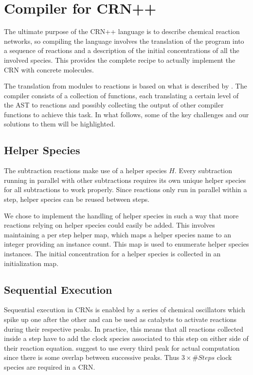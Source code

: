 \section{Compiler for CRN++} %

The ultimate purpose of the CRN++ language is to describe chemical reaction networks, so compiling the language involves the translation of the program into a sequence of reactions and a description of the initial concentrations of all the involved species. This provides the complete recipe to actually implement the CRN with concrete molecules. 

The translation from modules to reactions is based on what is described by \citeauthor{soloveichik2018a} \cite{soloveichik2018a}. The compiler consists of a collection of functions, each translating a certain level of the AST to reactions and possibly collecting the output of other compiler functions to achieve this task. In what follows, some of the key challenges and our solutions to them will be highlighted.

\subsection{Helper Species}
The subtraction reactions make use of a helper species $H$. Every subtraction running in parallel with other subtractions requires its own unique helper species for all subtractions to work properly. Since reactions only run in parallel within a step, helper species can be reused between steps. 

We chose to implement the handling of helper species in such a way that more reactions relying on helper species could easily be added. This involves maintaining a per step helper map, which maps a helper species name to an integer providing an instance count. This map is used to  enumerate helper species instances. The initial concentration for a helper species is collected in an initialization map.

\subsection{Sequential Execution}
Sequential execution in CRNs is enabled by a series of chemical oscillators which spike up one after the other and can be used as catalysts to activate reactions during their respective peaks. In practice, this means that all reactions collected inside a step have to add the clock species associated to this step on either side of their reaction equation. \citeauthor{soloveichik2018a} suggest to use every third peak for actual computation since there is some overlap between successive peaks. Thus $3\times \#Steps$ clock species are required in a CRN.

